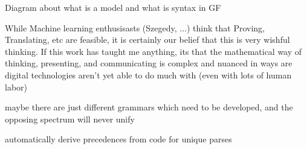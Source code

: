 \documentclass[10pt]{beamer}
\begin{document}
\begin{frame}
Diagram about what is a model and what is syntax in GF

While Machine learning enthusisasts (Szegedy, ...) think that Proving,
Translating, etc are feasible, it is certainly our belief that this is very
wishful thinking.  If this work has taught me anything, its that the
mathematical way of thinking, presenting, and communicating is complex and nuanced in ways
are digital technologies aren't yet able to do much with (even with lots of
human labor)

maybe there are just different grammars which need to be developed, and the
opposing spectrum will never unify

automatically derive precedences from code for unique parses

\end{frame}
\end{document}

